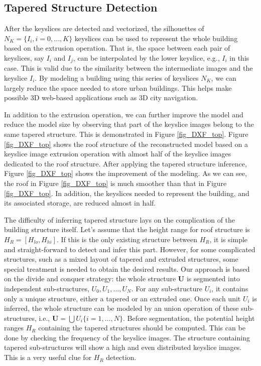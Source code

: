 \documentclass{llncs}
\begin{document}
\subsection{Tapered Structure Detection}
\label{sec_tsd}
After the keyslices are detected and vectorized, the silhouettes of
$N_K = \{I_{i}, i = 0, ..., K \}$ keyslices
can be used to represent the whole building based on the extrusion operation.
That is, the space between each pair of keyslices, say $I_{i}$ and $I_{j}$,
can be interpolated by the lower keyslice, e.g., $I_{i}$ in this case.
This is valid due to the similarity between the intermediate images and the
keyslice $I_{i}$.
By modeling a building using this series of keyslices $N_K$, we can largely
reduce the space needed to store urban buildings.
This helps make possible 3D web-based applications such as 3D city navigation.

In addition to the extrusion operation, we can further improve the model
and reduce the model size by observing that part of the keyslice images
belong to the same tapered structure.
This is demonstrated in Figure \ref{fig_DXF_top}.
Figure \ref{fig_DXF_top} shows the roof structure
of the reconstructed model based on a keyslice image extrusion operation with
almost half of the keyslice images dedicated to the roof structure.
After applying the tapered structure inference,
Figure \ref{fig_DXF_top}
shows the improvement of the modeling.
As we can see, the roof in Figure \ref{fig_DXF_top}
is much smoother than that in Figure \ref{fig_DXF_top}.
In addition, the keyslices needed to represent the building, and its
associated storage, are reduced almost in half.

The difficulty of inferring tapered structure lays on the complication of
the building structure itself.
Let's assume that the height range for roof structure is
$H_R = [H_{lo}, H_{hi}]$.
If this is the only existing structure between $H_R$, it is simple and
straight-forward to detect and infer this part.
However, for some complicated structures, such as a mixed layout
of tapered and extruded structures, some special treatment is needed to obtain
the desired results.
Our approach is based on the divide and conquer strategy: the whole
structure $\boldsymbol{U}$ is segmented into independent sub-structures,
$U_0, U_1, \ldots, U_N$. For any sub-structure $U_i$,
it contains only a unique structure, either a tapered or an extruded one. Once
each unit $U_i$ is inferred, the whole structure can be modeled by an union operation
of these sub-structures, i.e., $\boldsymbol{U} = \bigcup{U_i\{ i = 1,\ldots,N\}}$.
Before segmentation, the potential height ranges $H_R$ containing the tapered structures should be computed.
This can be done by checking the frequency of the keyslice images.
The structure containing tapered sub-structures will show a high and even
distributed keyslice images. This is a very useful clue for $H_R$ detection.
\end{document}
